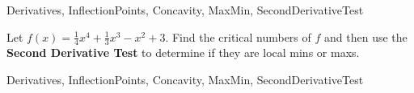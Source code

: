 \begin{tagblock}{Derivatives, InflectionPoints, Concavity, MaxMin, SecondDerivativeTest }
\begin{question}

Let $\displaystyle f(x) = \frac{1}{4}x^4 + \frac{1}{3}x^3 - x^2 +3$.  Find the critical numbers of $f$ and then use the \textbf{Second Derivative Test} to determine if they are local mins or maxs.


	
\begin{tags}
	   Derivatives, InflectionPoints, Concavity, MaxMin, SecondDerivativeTest
\end{tags}
	
\begin{diary}
\end{diary}
	
\begin{solution}
	   
\end{solution}
	
\end{question}

\end{tagblock}


